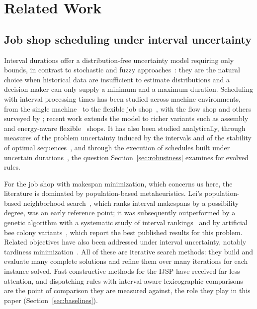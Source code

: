\documentclass[review,authoryear,11pt]{elsarticle}
\begin{document}
\section{Related Work}
\label{sec:related}

\subsection{Job shop scheduling under interval uncertainty}
Interval durations offer a distribution-free uncertainty model requiring
only bounds, in contrast to stochastic and fuzzy
approaches~\citep{Palacios2015}: they are the natural choice when
historical data are insufficient to estimate distributions and a
decision maker can only supply a minimum and a maximum duration.
Scheduling with interval processing times has been studied across
machine environments, from the single machine~\citep{Allahverdi2014} to
the flexible job shop~\citep{Xu2023}, with the flow shop and others
surveyed by \citet{Allahverdi2022}; recent work extends the model to
richer variants such as assembly~\citep{Zheng2024} and energy-aware
flexible~\citep{Afsar2025} shops. It has also been studied analytically, through measures of
the problem uncertainty induced by the intervals and of the stability of
optimal sequences~\citep{Sotskov2013}, and through the execution of
schedules built under uncertain durations~\citep{Sotskov2020}, the
question Section~\ref{sec:robustness} examines for evolved rules.

For the job shop with makespan minimization, which concerns us here, the
literature is dominated by population-based metaheuristics. Lei's
population-based neighborhood search~\citep{Lei2011}, which ranks
interval makespans by a possibility degree, was an early reference
point; it was subsequently outperformed by a genetic algorithm with a
systematic study of interval rankings~\citep{DiazGA2020} and by
artificial bee colony variants~\citep{DiazFEABC2023,DiazICAE2023}, which
report the best published results for this problem. Related objectives
have also been addressed under interval uncertainty, notably tardiness
minimization~\citep{DiazTardiness2022}. All of these are iterative search
methods: they build and evaluate many complete solutions and refine them
over many iterations for each instance solved. Fast constructive methods
for the IJSP have received far less attention, and dispatching rules with
interval-aware lexicographic comparisons are the point of comparison they
are measured against, the role they play in this paper
(Section~\ref{sec:baselines}).
\end{document}
